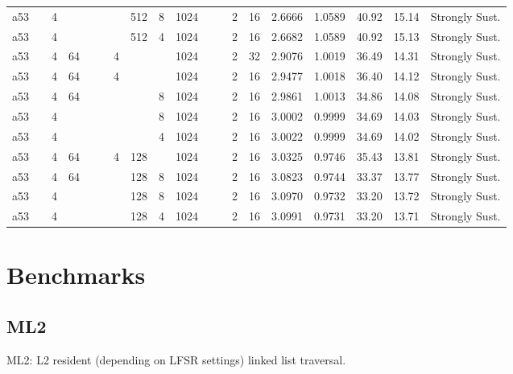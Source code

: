 \documentclass[11pt]{article}
\begin{document}
\begin{table}[H]
{\begin{tabular}{lllllllllllllllllll}
a53 &  & 4 &  &  &  &  & 512 & 8 & 1024 &  &  & 2 & 16 & 2.6666 & 1.0589 & 40.92 & 15.14 & Strongly Sust. \\
a53 &  & 4 &  &  &  &  & 512 & 4 & 1024 &  &  & 2 & 16 & 2.6682 & 1.0589 & 40.92 & 15.13 & Strongly Sust. \\
a53 &  & 4 & 64 &  &  & 4 &  &  & 1024 &  &  & 2 & 32 & 2.9076 & 1.0019 & 36.49 & 14.31 & Strongly Sust. \\
a53 &  & 4 & 64 &  &  & 4 &  &  & 1024 &  &  & 2 & 16 & 2.9477 & 1.0018 & 36.40 & 14.12 & Strongly Sust. \\
a53 &  & 4 & 64 &  &  &  &  & 8 & 1024 &  &  & 2 & 16 & 2.9861 & 1.0013 & 34.86 & 14.08 & Strongly Sust. \\
a53 &  & 4 &  &  &  &  &  & 8 & 1024 &  &  & 2 & 16 & 3.0002 & 0.9999 & 34.69 & 14.03 & Strongly Sust. \\
a53 &  & 4 &  &  &  &  &  & 4 & 1024 &  &  & 2 & 16 & 3.0022 & 0.9999 & 34.69 & 14.02 & Strongly Sust. \\
a53 &  & 4 & 64 &  &  & 4 & 128 &  & 1024 &  &  & 2 & 16 & 3.0325 & 0.9746 & 35.43 & 13.81 & Strongly Sust. \\
a53 &  & 4 & 64 &  &  &  & 128 & 8 & 1024 &  &  & 2 & 16 & 3.0823 & 0.9744 & 33.37 & 13.77 & Strongly Sust. \\
a53 &  & 4 &  &  &  &  & 128 & 8 & 1024 &  &  & 2 & 16 & 3.0970 & 0.9732 & 33.20 & 13.72 & Strongly Sust. \\
a53 &  & 4 &  &  &  &  & 128 & 4 & 1024 &  &  & 2 & 16 & 3.0991 & 0.9731 & 33.20 & 13.71 & Strongly Sust. \\
\bottomrule
\end{tabular}
}
\end{table}

\section{Benchmarks}
\subsection{ML2}
ML2: L2 resident (depending on LFSR settings) linked list traversal.
\end{document}
